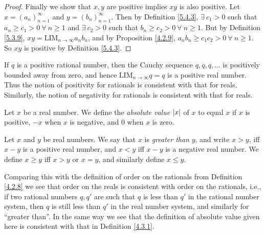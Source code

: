 \begin{proof}
Finally we show that \(x, y\) are positive implies \(xy\) is also positive.
Let \(x = (a_n)_{n = 1}^{\infty}\) and \(y = (b_n)_{n = 1}^{\infty}\).
Then by Definition \ref{5.4.3}, \(\exists\ c_1 > 0\) such that \(a_n \geq c_1 > 0 \ \forall\ n \geq 1\) and \(\exists\ c_2 > 0\) such that \(b_n \geq c_2 > 0 \ \forall\ n \geq 1\).
But by Definition \ref{5.3.9}, \(xy = \text{LIM}_{n \to \infty} a_n b_n\), and by Proposition \ref{4.2.9}, \(a_n b_n \geq c_1 c_2 > 0 \ \forall\ n \geq 1\).
So \(xy\) is positive by Definition \ref{5.4.3}.
\end{proof}

\begin{note}
If \(q\) is a positive rational number, then the Cauchy sequence \(q, q, q, \dots\) is positively bounded away from zero, and hence \(\text{LIM}_{n \to \infty} q = q\) is a positive real number.
Thus the notion of positivity for rationals is consistent with that for reals.
Similarly, the notion of negativity for rationals is consistent with that for reals.
\end{note}

\begin{definition}\label{5.4.5}
Let \(x\) be a real number.
We define the \emph{absolute value} \(\abs*{x}\) of \(x\) to equal \(x\) if \(x\) is positive, \(-x\) when \(x\) is negative, and \(0\) when \(x\) is zero.
\end{definition}

\begin{definition}\label{5.4.6}
Let \(x\) and \(y\) be real numbers.
We say that \(x\) is \emph{greater than} \(y\), and write \(x > y\), iff \(x - y\) is a positive real number, and \(x < y\) iff \(x - y\) is a negative real number.
We define \(x \geq y\) iff \(x > y\) or \(x = y\), and similarly define \(x \leq y\).
\end{definition}

\begin{note}
Comparing this with the definition of order on the rationals from Definition \ref{4.2.8} we see that order on the reals is consistent with order on the rationals, i.e., if two rational numbers \(q, q'\) are such that \(q\) is less than \(q'\) in the rational number system, then \(q\) is still less than \(q'\) in the real number system, and similarly for ``greater than''.
In the same way we see that the definition of absolute value given here is consistent with that in Definition \ref{4.3.1}.
\end{note}

